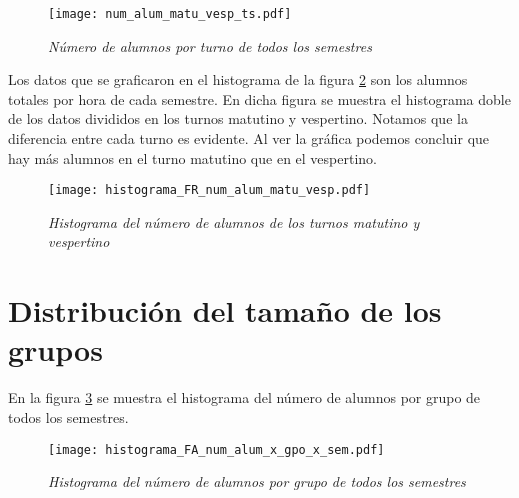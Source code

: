 \begin{figure}[H]
\centering
\texttt{[image: num\_alum\_matu\_vesp\_ts.pdf]} %
\caption{\textit{Número de alumnos por turno de todos los semestres}}\label{NumAlTotal_MatuVesp_ts}
\end{figure}



Los datos que se graficaron en el histograma de la figura \ref{histNumAlTotal_MatuVesp} son los alumnos totales por hora de cada semestre. En dicha figura se muestra el histograma doble de los datos divididos en los turnos matutino y vespertino. Notamos que la diferencia entre cada turno es evidente. Al ver la gráfica podemos concluir que hay más alumnos en el turno matutino que en el vespertino.

\begin{figure}[H]
\centering
\texttt{[image: histograma\_FR\_num\_alum\_matu\_vesp.pdf]} %
\caption{\textit{Histograma del número de alumnos de los turnos matutino y vespertino}}\label{histNumAlTotal_MatuVesp}
\end{figure}





\section{Distribución del tamaño de los grupos} \label{DitribTamGpos}
En la figura \ref{histNumAl_x_gpo_x_sem} se muestra el histograma del número de alumnos por grupo de todos los semestres. %

\begin{figure}[H]
\centering
\texttt{[image: histograma\_FA\_num\_alum\_x\_gpo\_x\_sem.pdf]} %
\caption{\textit{Histograma del número de alumnos por grupo de todos los semestres}}\label{histNumAl_x_gpo_x_sem}
\end{figure}


